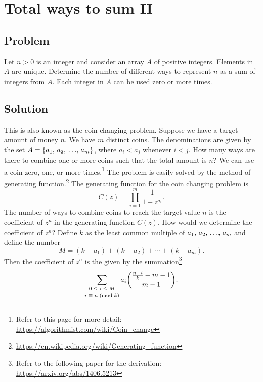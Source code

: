 
\section{Total ways to sum II}



\subsection*{Problem}

Let $n > 0$ is an integer and consider an array $A$ of positive
integers.  Elements in $A$ are unique.  Determine the number of
different ways to represent $n$ as a sum of integers from $A$.  Each
integer in $A$ can be used zero or more times.



\subsection*{Solution}

This is also known as the coin changing problem.  Suppose we have a
target amount of money $n$.  We have $m$ distinct coins.  The
denominations are given by the set $A = \left\{{{a}_1},\, {{a}_2},\, {\dots},\, {{a}_{m}}\right\}$, where
$a_i < a_j$ whenever $i < j$.  How many ways are there to combine one
or more coins such that the total amount is $n$?  We can use a coin
zero, one, or more times.\footnote{
  Refer to this page for more detail:
  \url{https://algorithmist.com/wiki/Coin_change}
}
The problem is easily solved by the method of generating
function.\footnote{
  \url{https://en.wikipedia.org/wiki/Generating_function}
}
The generating function for the coin changing problem is
\[
C(z)
=
\prod_{i=1}^{m}
\frac{
  1
}{
  1 - z^{a_i}
}.
\]
The number of ways to combine coins to reach the target value $n$ is
the coefficient of $z^n$ in the generating function $C(z)$.  How would
we determine the coefficient of $z^n$?  Define $k$ as the least common
multiple of ${{a}_1},\, {{a}_2},\, {\dots},\, {{a}_{m}}$ and define the number
\[
M
=
(k - a_1)
+
(k - a_2)
+
\cdots
+
(k - a_m).
\]
Then the coefficient of $z^n$ is the given by the summation\footnote{
  Refer to the following paper for the derivation:
  \url{https://arxiv.org/abs/1406.5213}
}
\[
\sum_{\substack{0 \; \leq \; i \; \leq \; M\\[2pt] {i} \; \equiv \; {n} \; (\text{mod}\; {k})}}
a_i
\binom{
  \frac{n-i}{k} + m - 1
}{
  m - 1
}.
\]
